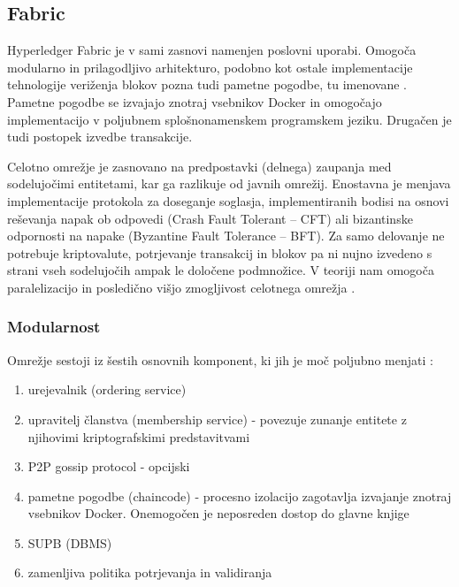 \documentclass[a4paper, 12pt]{book}
\begin{document}
\subsection{Fabric}
Hyperledger Fabric je v sami zasnovi namenjen poslovni uporabi.
Omogoča modularno in prilagodljivo arhitekturo, podobno kot ostale implementacije tehnologije veriženja blokov pozna tudi pametne pogodbe, tu imenovane .
Pametne pogodbe se izvajajo znotraj vsebnikov Docker in omogočajo implementacijo v poljubnem splošnonamenskem programskem jeziku.
Drugačen je tudi postopek izvedbe transakcije.

Celotno omrežje je zasnovano na predpostavki (delnega) zaupanja med sodelujočimi entitetami, kar ga razlikuje od javnih omrežij.
Enostavna je menjava implementacije protokola za doseganje soglasja, implementiranih bodisi na osnovi reševanja napak ob odpovedi (Crash Fault Tolerant -- CFT) ali bizantinske odpornosti na napake (Byzantine Fault Tolerance -- BFT).
Za samo delovanje ne potrebuje kriptovalute, potrjevanje transakcij in blokov pa ni nujno izvedeno s strani vseh sodelujočih ampak le določene podmnožice.
V teoriji nam omogoča paralelizacijo in posledično višjo zmogljivost celotnega omrežja \cite{hyperledgerDocs}.

\subsubsection{Modularnost}
Omrežje sestoji iz šestih osnovnih komponent, ki jih je moč poljubno menjati \cite{hyperledgerDocs}:
\begin{enumerate}
	\item urejevalnik (ordering service)
	\item upravitelj članstva (membership service) - povezuje zunanje entitete z njihovimi kriptografskimi predstavitvami
	\item P2P gossip protocol - opcijski
	\item pametne pogodbe (chaincode) - procesno izolacijo zagotavlja izvajanje znotraj vsebnikov Docker. 
	Onemogočen je neposreden dostop do glavne knjige
	\item SUPB (DBMS)
	\item zamenljiva politika potrjevanja in validiranja
\end{enumerate}
\end{document}
